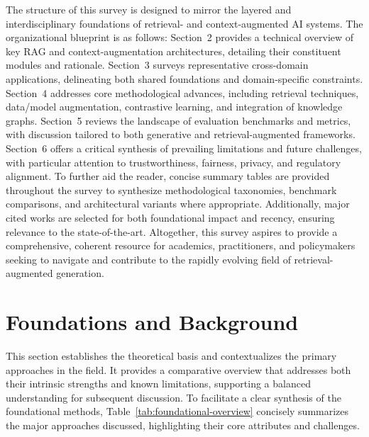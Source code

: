 \documentclass[sigconf]{acmart}
\begin{document}
The structure of this survey is designed to mirror the layered and interdisciplinary foundations of retrieval- and context-augmented AI systems. The organizational blueprint is as follows:
Section~2 provides a technical overview of key RAG and context-augmentation architectures, detailing their constituent modules and rationale.
Section~3 surveys representative cross-domain applications, delineating both shared foundations and domain-specific constraints.
Section~4 addresses core methodological advances, including retrieval techniques, data/model augmentation, contrastive learning, and integration of knowledge graphs.
Section~5 reviews the landscape of evaluation benchmarks and metrics, with discussion tailored to both generative and retrieval-augmented frameworks.
Section~6 offers a critical synthesis of prevailing limitations and future challenges, with particular attention to trustworthiness, fairness, privacy, and regulatory alignment.
To further aid the reader, concise summary tables are provided throughout the survey to synthesize methodological taxonomies, benchmark comparisons, and architectural variants where appropriate. Additionally, major cited works are selected for both foundational impact and recency, ensuring relevance to the state-of-the-art.
Altogether, this survey aspires to provide a comprehensive, coherent resource for academics, practitioners, and policymakers seeking to navigate and contribute to the rapidly evolving field of retrieval-augmented generation.

\section{Foundations and Background}

This section establishes the theoretical basis and contextualizes the primary approaches in the field. It provides a comparative overview that addresses both their intrinsic strengths and known limitations, supporting a balanced understanding for subsequent discussion. To facilitate a clear synthesis of the foundational methods, Table~\ref{tab:foundational-overview} concisely summarizes the major approaches discussed, highlighting their core attributes and challenges.
\end{document}
